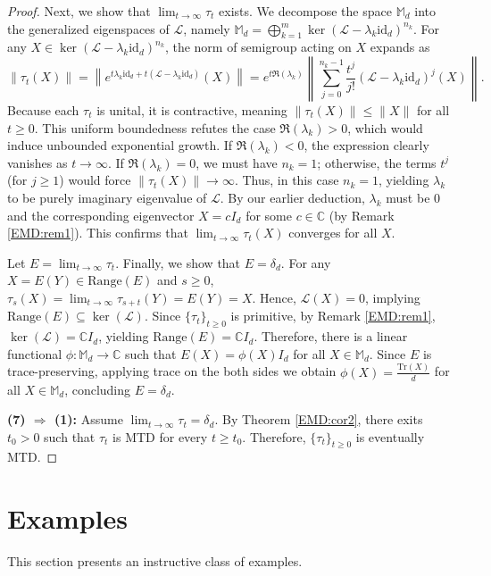 \documentclass[11pt,reqno]{amsart}
\theoremstyle{definition}
\theoremstyle{plain}
\theoremstyle{remark}
\numberwithin{equation}{section}%
\begin{document}
\begin{proof}
  	  
  	   Next, we show that $\lim_{t \to \infty} \tau_t$ exists. We decompose the space $\mathbb{M}_d$ into the generalized eigenspaces of $\mathcal{L}$, namely $\mathbb{M}_d = \bigoplus_{k=1}^m \ker(\mathcal{L}-\lambda_k\text{id}_d)^{n_k}$. For any $X \in \ker(\mathcal{L}-\lambda_k\text{id}_d)^{n_k}$, the norm of semigroup acting on $X$ expands as
  	  \[
  	  \|\tau_t(X)\| = \left\|e^{t\lambda_k\text{id}_d+t(\mathcal{L}-\lambda_k\text{id}_d)}(X)\right\| = e^{t\Re(\lambda_k)}\left\| \sum_{j=0}^{n_k-1} \frac{t^j}{j!} (\mathcal{L}-\lambda_k\text{id}_d)^j(X)\right\|.
  	  \]
  	  Because each $\tau_t$ is unital, it is contractive, meaning $\|\tau_t(X)\| \le \|X\|$ for all $t \ge 0$. This uniform boundedness refutes the case $\Re(\lambda_k) > 0$, which would induce unbounded exponential growth. If $\Re(\lambda_k) < 0$, the expression clearly vanishes as $t \to \infty$. If $\Re(\lambda_k) = 0$, we must have $n_k = 1$; otherwise, the terms $t^j$ (for $j \ge 1$) would force $\|\tau_t(X)\| \to \infty$. Thus, in this case $n_k=1$, yielding $\lambda_k$ to be purely imaginary eigenvalue of $\mathcal{L}$. By our earlier deduction, $\lambda_k$ must be $0$ and the corresponding eigenvector $X = cI_d$ for some $c \in \mathbb{C}$ (by Remark  \ref{EMD:rem1}). This confirms that $\lim_{t\to\infty}\tau_t(X)$ converges for all $X$.
  	  
  	  
  	    Let $E=\lim_{t \to \infty} \tau_t$. Finally, we show that $E= \delta_d$. For any $X=E(Y) \in \text{Range}(E)$ and $s\ge0$, $\tau_s(X) = \lim_{t \to \infty} \tau_{s+t}(Y) = E(Y) = X$. Hence, $\mathcal{L}(X) = 0$, implying $\text{Range}(E) \subseteq \ker(\mathcal{L})$. Since $\{\tau_t\}_{t\ge0}$ is primitive, by Remark \ref{EMD:rem1}, $\ker(\mathcal{L})= \mathbb{C}I_d$, yielding $\text{Range}(E)=\mathbb{C}I_d$. Therefore, there is a linear functional $\phi:\mathbb{M}_d\to\mathbb{C}$ such that $E(X)=\phi(X)I_d$ for all $X\in \mathbb{M}_d$. Since $E$ is trace-preserving, applying trace on the both sides we obtain $\phi(X)=\frac{\text{Tr}(X)}{d}$ for all $X\in \mathbb{M}_d$, concluding $E=\delta_d$.
  	    
  	    
  	    \noindent \textbf{(7) $\Rightarrow$ (1):} Assume $\lim_{t \to \infty} \tau_t = \delta_d$. By Theorem \ref{EMD:cor2}, there exits $t_0 > 0$ such that $\tau_{t}$ is MTD for every $t\geq t_0$. Therefore, $\{\tau_t\}_{t\geq 0}$ is eventually MTD.
  \end{proof}



   \section{Examples}\label{appendix}
   This section presents an instructive class of examples.
   
\end{document}
